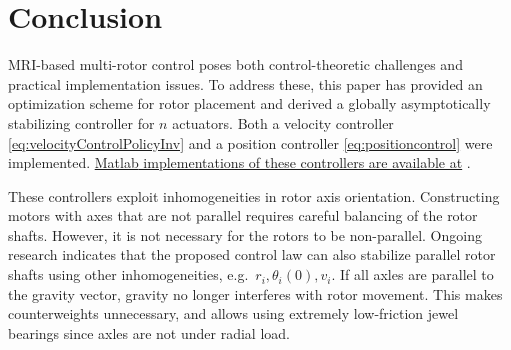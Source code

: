 \section{Conclusion}\label{sec:conclusion}
    
    
MRI-based multi-rotor control poses both control-theoretic challenges and practical implementation issues. To address these, this paper has provided an optimization scheme for rotor placement and derived a globally asymptotically stabilizing controller for $n$ actuators.  Both a velocity controller \eqref{eq:velocityControlPolicyInv} and a position controller \eqref{eq:positioncontrol} were implemented.  \href{http://www.mathworks.com/matlabcentral/fileexchange/45331}{{\sc Matlab} implementations of these controllers are available at} \cite{Becker2014b}.

    
These controllers exploit inhomogeneities in rotor axis orientation.  Constructing motors with axes that are not parallel requires careful balancing of the rotor shafts.  However, it is not necessary for the rotors to be non-parallel. Ongoing research indicates that the proposed control law can also stabilize parallel rotor shafts using other inhomogeneities, e.g.~$r_i, \theta_i(0), v_i$.  If all axles are parallel to the gravity vector, gravity no longer interferes with rotor movement.  This makes counterweights unnecessary, and allows using extremely low-friction jewel bearings since axles are not under radial load.


 


